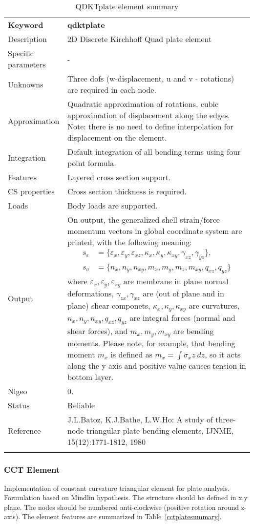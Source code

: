 \documentclass[a4paper]{article}
\newcommand{\param}[1]{\texttt{#1}} %
\newcommand{\templabel}{}%
\newcommand{\tempcaption}{}%
\newcounter{nelpar}
\newenvironment{elementsummary}[5]{%
  \gdef\tempcaption{#4}%
  \gdef\templabel{#5}%
  \setcounter{nelpar}{0}%
  \begin{center} %
    \begin{table}[!htb] %
      \begin{tabular}{|l|p{9cm}|}\hline %
        {\bf Keyword} & \bf{#1}\\ %
        {Description} & {#2}\\ %
        {Specific parameters} & {#3}\\ \hline %
}{
  \\ \hline %
      \end{tabular}%
      \caption{\tempcaption}%
      \label{\templabel}%
    \end{table}%
  \end{center}%
}
\newcommand{\elementParam}[1]{%
  \ifthenelse{\value{nelpar}>0} %
             {&{#1}}%
             {\setcounter{nelpar}{1}Parameters&{#1}}%
             \\%
}
\newcommand{\elementDescription}[2]{{#1} & {#2}\\ }
\begin{document}
\begin{elementsummary}{qdktplate}{2D Discrete Kirchhoff Quad plate element}{-}{QDKTplate element summary}{qdktplatesummary}
\elementDescription{Unknowns}{Three dofs (w-displacement, u and v - rotations) are required in each node.}
\elementDescription{Approximation}{Quadratic approximation of rotations, cubic approximation of displacement along the edges. Note: there is no need to define interpolation for displacement on the element.}
\elementDescription{Integration}{Default integration of all bending terms using four point formula.}
\elementDescription{Features}{Layered cross section support.}
\elementDescription{CS properties}{Cross section thickness is required.}
\elementDescription{Loads}{Body loads are supported.}
\elementDescription{Output}{On output, the generalized shell strain/force momentum vectors in global coordinate system are printed, with the following meaning:
\begin{align*}
s_{\varepsilon} &= \{\varepsilon_x, \varepsilon_y, \varepsilon_{xz}, \kappa_x, \kappa_y, \kappa_{xy}, \gamma_{xz}, \gamma_{yz}\},\\
s_{\sigma} &= \{n_x, n_y, n_{xy}, m_x, m_y, m_z, m_{xy}, q_{xz}, q_{yz}\}
\end{align*}
where $\varepsilon_x, \varepsilon_y, \varepsilon_{xy}$ are membrane in plane normal deformations, $\gamma_{zx}, \gamma_{xz}$ are (out of plane and in plane) shear componets, $\kappa_x, \kappa_y, \kappa_{xy}$ are curvatures, $n_x, n_y, n_{xy}, q_{xz}, q_{yz}$ are integral forces (normal and shear forces), and $m_x, m_y, m_{xy}$ are bending moments. 
Please note, for example, that bending moment $m_x$ is defined as $m_x=\int \sigma_x z\ dz$, so it acts along the y-axis and positive value causes tension in bottom layer.}
\elementDescription{Nlgeo}{0.}
\elementDescription{Status}{Reliable}
\elementDescription{Reference}{J.L.Batoz, K.J.Bathe, L.W.Ho: A study of three-node triangular plate bending elements, IJNME, 15(12):1771-1812, 1980}
\end{elementsummary}

\subsubsection {CCT Element}
\label{cct}
Implementation of constant curvature triangular element for plate
analysis. Formulation based on Mindlin hypothesis. The structure should be defined in x,y plane. 
The nodes should be numbered anti-clockwise (positive rotation around
z-axis). The element features are summarized in Table~\ref{cctplatesummary}.
\end{document}
